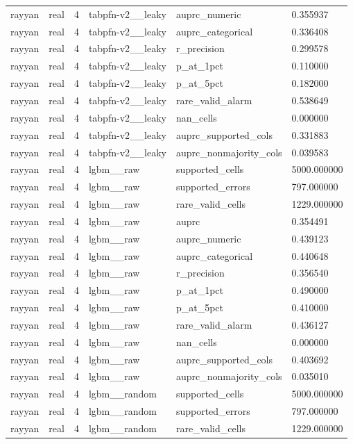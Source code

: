 \begin{tabular}{llllll}
rayyan & real & 4 & tabpfn-v2\_\_leaky & auprc\_numeric & 0.355937 \\
rayyan & real & 4 & tabpfn-v2\_\_leaky & auprc\_categorical & 0.336408 \\
rayyan & real & 4 & tabpfn-v2\_\_leaky & r\_precision & 0.299578 \\
rayyan & real & 4 & tabpfn-v2\_\_leaky & p\_at\_1pct & 0.110000 \\
rayyan & real & 4 & tabpfn-v2\_\_leaky & p\_at\_5pct & 0.182000 \\
rayyan & real & 4 & tabpfn-v2\_\_leaky & rare\_valid\_alarm & 0.538649 \\
rayyan & real & 4 & tabpfn-v2\_\_leaky & nan\_cells & 0.000000 \\
rayyan & real & 4 & tabpfn-v2\_\_leaky & auprc\_supported\_cols & 0.331883 \\
rayyan & real & 4 & tabpfn-v2\_\_leaky & auprc\_nonmajority\_cols & 0.039583 \\
rayyan & real & 4 & lgbm\_\_raw & supported\_cells & 5000.000000 \\
rayyan & real & 4 & lgbm\_\_raw & supported\_errors & 797.000000 \\
rayyan & real & 4 & lgbm\_\_raw & rare\_valid\_cells & 1229.000000 \\
rayyan & real & 4 & lgbm\_\_raw & auprc & 0.354491 \\
rayyan & real & 4 & lgbm\_\_raw & auprc\_numeric & 0.439123 \\
rayyan & real & 4 & lgbm\_\_raw & auprc\_categorical & 0.440648 \\
rayyan & real & 4 & lgbm\_\_raw & r\_precision & 0.356540 \\
rayyan & real & 4 & lgbm\_\_raw & p\_at\_1pct & 0.490000 \\
rayyan & real & 4 & lgbm\_\_raw & p\_at\_5pct & 0.410000 \\
rayyan & real & 4 & lgbm\_\_raw & rare\_valid\_alarm & 0.436127 \\
rayyan & real & 4 & lgbm\_\_raw & nan\_cells & 0.000000 \\
rayyan & real & 4 & lgbm\_\_raw & auprc\_supported\_cols & 0.403692 \\
rayyan & real & 4 & lgbm\_\_raw & auprc\_nonmajority\_cols & 0.035010 \\
rayyan & real & 4 & lgbm\_\_random & supported\_cells & 5000.000000 \\
rayyan & real & 4 & lgbm\_\_random & supported\_errors & 797.000000 \\
rayyan & real & 4 & lgbm\_\_random & rare\_valid\_cells & 1229.000000 \\

\end{tabular}
